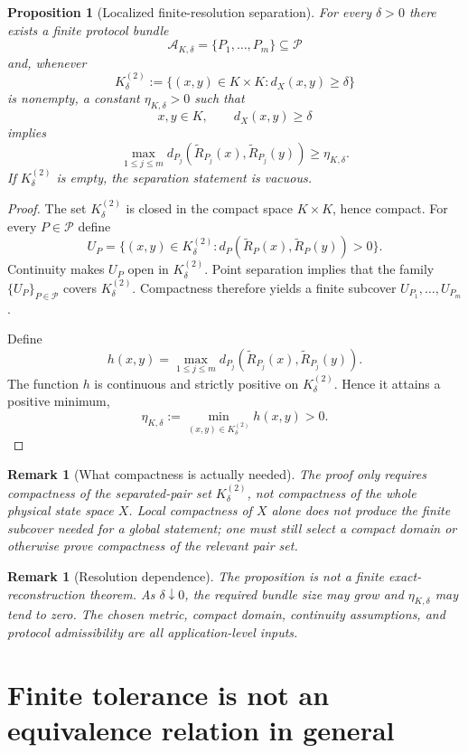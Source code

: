 \documentclass[11pt]{article}
\newtheorem{proposition}[definition]{Proposition}
\newtheorem{remark}[definition]{Remark}
\newcommand{\Pcal}{\mathcal P}
\newcommand{\Acal}{\mathcal A}
\begin{document}
\begin{proposition}[Localized finite-resolution separation]\label{prop:finite-resolution}
For every $\delta>0$ there exists a finite protocol bundle
\[
\Acal_{K,\delta}=\{P_1,\dots,P_m\}\subseteq\Pcal
\]
and, whenever
\[
K^{(2)}_{\delta}
:=
\{(x,y)\in K\times K:d_X(x,y)\ge\delta\}
\]
is nonempty, a constant $\eta_{K,\delta}>0$ such that
\[
x,y\in K,
\qquad
d_X(x,y)\ge\delta
\]
implies
\[
\max_{1\le j\le m}
 d_{P_j}\!\left(
 \widetilde R_{P_j}(x),
 \widetilde R_{P_j}(y)
 \right)
\ge\eta_{K,\delta}.
\]
If $K^{(2)}_{\delta}$ is empty, the separation statement is vacuous.
\end{proposition}

\begin{proof}
The set $K^{(2)}_{\delta}$ is closed in the compact space $K\times K$, hence
compact. For every $P\in\Pcal$ define
\[
U_P
=
\{(x,y)\in K^{(2)}_{\delta}:
 d_P(\widetilde R_P(x),\widetilde R_P(y))>0\}.
\]
Continuity makes $U_P$ open in $K^{(2)}_{\delta}$. Point separation implies
that the family $\{U_P\}_{P\in\Pcal}$ covers $K^{(2)}_{\delta}$. Compactness
therefore yields a finite subcover $U_{P_1},\dots,U_{P_m}$.

Define
\[
h(x,y)
=
\max_{1\le j\le m}
 d_{P_j}(\widetilde R_{P_j}(x),\widetilde R_{P_j}(y)).
\]
The function $h$ is continuous and strictly positive on
$K^{(2)}_{\delta}$. Hence it attains a positive minimum,
\[
\eta_{K,\delta}
:=
\min_{(x,y)\in K^{(2)}_{\delta}}h(x,y)>0.
\]
\end{proof}

\begin{remark}[What compactness is actually needed]
The proof only requires compactness of the separated-pair set
$K^{(2)}_{\delta}$, not compactness of the whole physical state space $X$.
Local compactness of $X$ alone does not produce the finite subcover needed for
a global statement; one must still select a compact domain or otherwise prove
compactness of the relevant pair set.
\end{remark}

\begin{remark}[Resolution dependence]
The proposition is not a finite exact-reconstruction theorem. As
$\delta\downarrow0$, the required bundle size may grow and
$\eta_{K,\delta}$ may tend to zero. The chosen metric, compact domain,
continuity assumptions, and protocol admissibility are all application-level
inputs.
\end{remark}

\section{Finite tolerance is not an equivalence relation in general}
\end{document}
